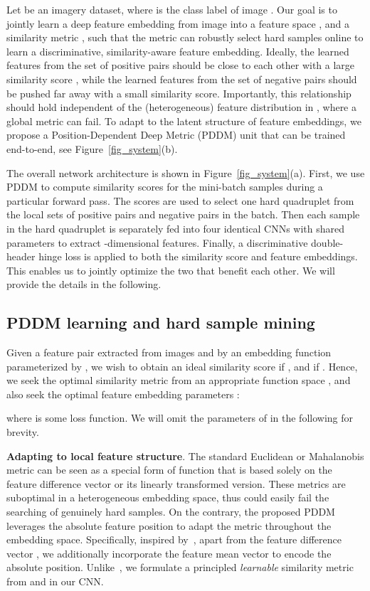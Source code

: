 \documentclass{article}
\begin{document}
Let  be an imagery dataset, where  is the class label of image . Our goal is to jointly learn a deep feature embedding  from image  into a feature space , and a similarity metric , such that the metric can robustly select hard samples online to learn a discriminative, similarity-aware feature embedding. Ideally, the learned features  from the set of positive pairs  should be close to each other with a large similarity score , while the learned features from the set of negative pairs  should be pushed far away with a small similarity score. Importantly, this relationship should hold independent of the (heterogeneous) feature distribution in , where a global metric  can fail. To adapt  to the latent structure of feature embeddings, we propose a Position-Dependent Deep Metric (PDDM) unit that can be trained end-to-end, see Figure~\ref{fig_system}(b).

The overall network architecture is shown in Figure~\ref{fig_system}(a). First, we use PDDM to compute similarity scores for the mini-batch samples during a particular forward pass. The scores are used to select one hard quadruplet from the local sets of positive pairs  and negative pairs  in the batch. Then each sample in the hard quadruplet is separately fed into four identical CNNs with shared parameters  to extract -dimensional features. Finally, a discriminative double-header hinge loss is applied to both the similarity score and feature embeddings. This enables us to jointly optimize the two that benefit each other. We will provide the details in the following.

\subsection{PDDM learning and hard sample mining}
Given a feature pair  extracted from images  and  by an embedding function  parameterized by , we wish to obtain an ideal similarity score  if , and  if . Hence, we seek the optimal similarity metric  from an appropriate function space , and also seek the optimal feature embedding parameters :

where  is some loss function. We will omit the parameters  of  in the following for brevity.

\vspace{0.1cm} \noindent
\textbf{Adapting to local feature structure}.
The standard Euclidean or Mahalanobis metric can be seen as a special form of function  that is based solely on the feature difference vector  or its linearly transformed version.
These metrics are suboptimal in a heterogeneous embedding space, thus could easily fail the searching of genuinely hard samples. On the contrary, the proposed PDDM leverages the absolute feature position to adapt the metric throughout the embedding space. Specifically, inspired by~\cite{XiJoXuKDD2012}, apart from the feature difference vector , we additionally incorporate the feature mean vector  to encode the absolute position. Unlike~\cite{XiJoXuKDD2012}, we formulate a principled \emph{learnable} similarity metric from  and  in our CNN.
\end{document}
